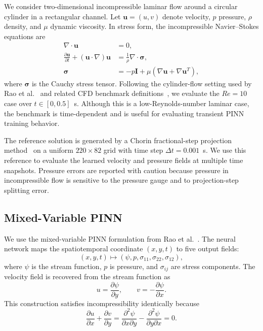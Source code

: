 \documentclass{article}
\begin{document}
We consider two-dimensional incompressible laminar flow around a circular cylinder in a rectangular channel. Let $\mathbf{u}=(u,v)$ denote velocity, $p$ pressure, $\rho$ density, and $\mu$ dynamic viscosity. In stress form, the incompressible Navier--Stokes equations are
\begin{align}
    \nabla \cdot \mathbf{u} &= 0, \\
    \frac{\partial \mathbf{u}}{\partial t} + (\mathbf{u}\cdot\nabla)\mathbf{u}
    &= \frac{1}{\rho}\nabla\cdot\boldsymbol{\sigma}, \\
    \boldsymbol{\sigma} &= -p\mathbf{I} + \mu\left(\nabla\mathbf{u}+\nabla\mathbf{u}^{T}\right),
\end{align}
where $\boldsymbol{\sigma}$ is the Cauchy stress tensor. Following the cylinder-flow setting used by Rao et al.~\cite{rao2020pinnflow} and related CFD benchmark definitions~\cite{schafer1996benchmark}, we evaluate the $Re=10$ case over $t\in[0,0.5]$~s. Although this is a low-Reynolds-number laminar case, the benchmark is time-dependent and is useful for evaluating transient PINN training behavior.

The reference solution is generated by a Chorin fractional-step projection method~\cite{chorin1968projection} on a uniform $220\times82$ grid with time step $\Delta t=0.001$~s. We use this reference to evaluate the learned velocity and pressure fields at multiple time snapshots. Pressure errors are reported with caution because pressure in incompressible flow is sensitive to the pressure gauge and to projection-step splitting error.

\subsection{Mixed-Variable PINN}

We use the mixed-variable PINN formulation from Rao et al.~\cite{rao2020pinnflow}. The neural network maps the spatiotemporal coordinate $(x,y,t)$ to five output fields:
\begin{equation}
    (x,y,t) \mapsto (\psi, p, \sigma_{11}, \sigma_{22}, \sigma_{12}),
\end{equation}
where $\psi$ is the stream function, $p$ is pressure, and $\sigma_{ij}$ are stress components. The velocity field is recovered from the stream function as
\begin{equation}
    u = \frac{\partial \psi}{\partial y}, \qquad
    v = -\frac{\partial \psi}{\partial x}.
\end{equation}
This construction satisfies incompressibility identically because
\begin{equation}
    \frac{\partial u}{\partial x} + \frac{\partial v}{\partial y}
    = \frac{\partial^2\psi}{\partial x\partial y}
    - \frac{\partial^2\psi}{\partial y\partial x} = 0.
\end{equation}
\end{document}
